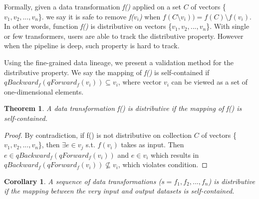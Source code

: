 \documentclass{sig-alternate}
\newtheorem{theorem}{Theorem}[section]
\newtheorem{corollary}{Corollary}[theorem]
\begin{document}
Formally, given a data transformation {\it f()} applied on a set $C$ of vectors \{$v_1, v_2, ..., v_n$\}.
we say it is safe to remove {\it f($v_i$)} when {\it $f(C \setminus {v_i})) = f(C) \setminus {f(v_i)}$}.
In other words, function {\it f()} is distributive on vectors \{$v_1, v_2, ..., v_n$\}. 
With single or few transformers, users are able to track the distributive property.
However when the pipeline is deep, such property is hard to track.

Using the fine-grained data lineage, we present a validation method for the distributive property.
We say the mapping of {\it f()} is self-contained if $qBackward_f(qForward_f(v_i)) \subseteq v_i$, where vector $v_i$ can be viewed 
as a set of one-dimensional elements.


\begin{theorem}
\label{thm:distributive}
A data transformation f() is distributive if the mapping of f() is self-contained.
\end{theorem}

\begin{proof}
By contradiction, if f() is not distributive on collection $C$ of vectors  \{$v_1, v_2, ..., v_n$\}, then $\exists e \in v_j $ s.t. $f(v_i)$ takes as input.
Then $e \in qBackward_f(qForward_f(v_i))$ and $e \in v_i$ which results in  $qBackward_f(qForward_f(v_i)) \nsubseteq v_i$, which violates condition.
\end{proof}

\begin{corollary}
A sequence of data transformations ($s = {f_1, f_2, ..., f_n}$) is distributive if the mapping between the very input and output datasets is self-contained.
\end{corollary}



\end{document}
